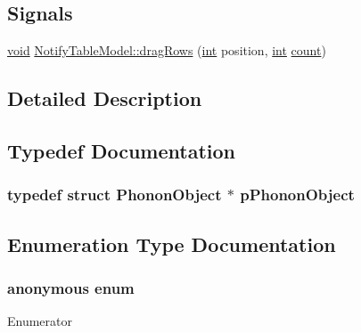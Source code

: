 \subsection*{Signals}
\begin{DoxyCompactItemize}
\item 
\hyperlink{group___u_a_v_objects_plugin_ga444cf2ff3f0ecbe028adce838d373f5c}{void} \hyperlink{group__notifyplugin_ga87b02089128dd9f2eddbd2e70040201f}{Notify\-Table\-Model\-::drag\-Rows} (\hyperlink{ioapi_8h_a787fa3cf048117ba7123753c1e74fcd6}{int} position, \hyperlink{ioapi_8h_a787fa3cf048117ba7123753c1e74fcd6}{int} \hyperlink{glext_8h_a5b40aca7a9682963dd00a8f5aef0a901}{count})
\end{DoxyCompactItemize}


\subsection{Detailed Description}


\subsection{Typedef Documentation}
\hypertarget{group__notifyplugin_ga29339e638aa7c15d99ff655f2f0e2c89}{
\subsubsection[{p\-Phonon\-Object}]{\setlength{\rightskip}{0pt plus 5cm}typedef  {\bf struct} {\bf Phonon\-Object} $\ast$ {\bf p\-Phonon\-Object}}}\label{group__notifyplugin_ga29339e638aa7c15d99ff655f2f0e2c89}


\subsection{Enumeration Type Documentation}
\hypertarget{group__notifyplugin_gaa52522623ea593ea4ed734f3e904d7d4}{\subsubsection[{anonymous enum}]{\setlength{\rightskip}{0pt plus 5cm}anonymous enum}}\label{group__notifyplugin_gaa52522623ea593ea4ed734f3e904d7d4}
\begin{Desc}
\item[Enumerator]\par
\begin{description}
\item[{\em 
\hypertarget{group__notifyplugin_ggaa52522623ea593ea4ed734f3e904d7d4a8fee5829d0108684543cf01a53af668f}{e\-Default\-Timeout}\label{group__notifyplugin_ggaa52522623ea593ea4ed734f3e904d7d4a8fee5829d0108684543cf01a53af668f}
}]\end{description}
\end{Desc}


